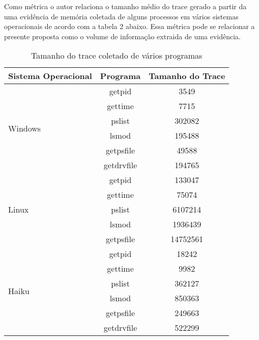 \documentclass[
	12pt,				%
	openright,			%
	oneside,			%
	a4paper,			%
	english,			%
	french,				%
	spanish,			%
	brazil,				%
	]{abntex2}
\begin{document}
\begin{itemize}
Como métrica o autor relaciona o tamanho médio do trace gerado a partir da uma evidência de memória coletada de alguns processos em vários sistemas operacionais de acordo 
com a tabela 2 abaixo. Essa métrica pode se relacionar a presente proposta como o volume de informação extraida de uma evidência.

\begin{table}[]
\centering
\caption{Tamanho do trace coletado de vários programas}
\label{my-label}
\begin{tabular}{l|c|c}
\hline
\textbf{Sistema Operacional}		&\textbf{Programa}	      & \textbf{Tamanho do Trace}\\ \hline
\multirow{6}{*}{Windows}                & getpid                      & 3549			 \\
                                        & gettime                     & 7715    		 \\
                                        & pslist                      & 302082  		 \\
                                        & lsmod                       & 195488   		 \\
                                        & getpsfile                   & 49588   		 \\
                                        & getdrvfile                  & 194765  		 \\
\multirow{5}{*}{Linux}                  & getpid                      & 133047                   \\ \hline
                                        & gettime                     & 75074                    \\
                                        & pslist                      & 6107214                  \\
                                        & lsmod                       & 1936439                  \\
                                        & getpsfile                   & 14752561                 \\
\multirow{6}{*}{Haiku}                  & getpid                      & 18242                    \\ \hline
                                        & gettime                     & 9982                     \\
                                        & pslist                      & 362127                   \\
                                        & lsmod                       & 850363                   \\
                                        & getpsfile                   & 249663                   \\
                                        & getdrvfile                  & 522299                   \\ 
\end{tabular}
\end{table}


\end{itemize}
\end{document}
